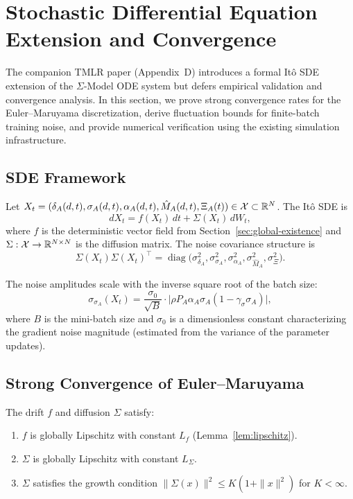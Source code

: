 
\section{Stochastic Differential Equation Extension and Convergence}
\label{sec:sde}

The companion TMLR paper (Appendix~D) introduces a formal It\^o SDE
extension of the $\Sigma$-Model ODE system but defers empirical validation
and convergence analysis. In this section, we prove strong convergence
rates for the Euler--Maruyama discretization, derive fluctuation bounds
for finite-batch training noise, and provide numerical verification
using the existing simulation infrastructure.

\subsection{SDE Framework}

Let $X_t = (\delta_A(d,t), \sigma_A(d,t), \alpha_A(d,t),
\hat{M}_A(d,t), \Xi_A(t)) \in \mathcal{X} \subset \mathbb{R}^N$. The It\^o SDE is
\[
dX_t = f(X_t)\,dt + \Sigma(X_t)\,dW_t,
\]
where $f$ is the deterministic vector field from
Section~\ref{sec:global-existence} and $\Sigma: \mathcal{X} \to \mathbb{R}^{N \times N}$
is the diffusion matrix. The noise covariance structure is
\[
\Sigma(X_t)\Sigma(X_t)^\top = \operatorname{diag}\bigl(
\sigma_{\delta_A}^2, \sigma_{\sigma_A}^2, \sigma_{\alpha_A}^2,
\sigma_{\hat{M}_A}^2, \sigma_{\Xi}^2 \bigr).
\]

The noise amplitudes scale with the inverse square root of the batch
size:
\[
\sigma_{\sigma_A}(X_t) = \frac{\sigma_0}{\sqrt{B}} \cdot
\bigl|\rho P_A \alpha_A \sigma_A (1 - \gamma_\sigma \sigma_A)\bigr|,
\]
where $B$ is the mini-batch size and $\sigma_0$ is a dimensionless
constant characterizing the gradient noise magnitude (estimated from
the variance of the parameter updates).

\subsection{Strong Convergence of Euler--Maruyama}

\begin{assumption}
\label{assum:sde-regularity}
The drift $f$ and diffusion $\Sigma$ satisfy:
\begin{enumerate}
\item $f$ is globally Lipschitz with constant $L_f$ (Lemma~\ref{lem:lipschitz}).
\item $\Sigma$ is globally Lipschitz with constant $L_\Sigma$.
\item $\Sigma$ satisfies the growth condition
  $\|\Sigma(x)\|^2 \leq K(1 + \|x\|^2)$ for $K < \infty$.
\end{enumerate}
\end{assumption}

